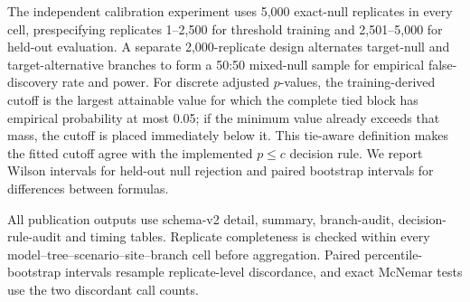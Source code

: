 The independent calibration experiment uses 5,000 exact-null replicates in every cell, prespecifying replicates 1--2,500 for threshold training and 2,501--5,000 for held-out evaluation. A separate 2,000-replicate design alternates target-null and target-alternative branches to form a 50:50 mixed-null sample for empirical false-discovery rate and power. For discrete adjusted \(p\)-values, the training-derived cutoff is the largest attainable value for which the complete tied block has empirical probability at most 0.05; if the minimum value already exceeds that mass, the cutoff is placed immediately below it. This tie-aware definition makes the fitted cutoff agree with the implemented \(p\leq c\) decision rule. We report Wilson intervals for held-out null rejection and paired bootstrap intervals for differences between formulas.

All publication outputs use schema-v2 detail, summary, branch-audit, decision-rule-audit and timing tables. Replicate completeness is checked within every model--tree--scenario--site--branch cell before aggregation. Paired percentile-bootstrap intervals resample replicate-level discordance, and exact McNemar tests use the two discordant call counts.
